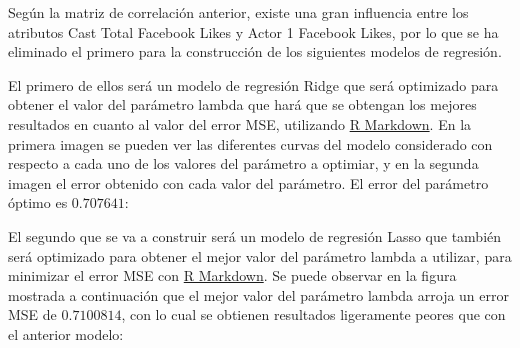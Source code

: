 \documentclass{article}
\begin{document}
Según la matriz de correlación anterior, existe una gran influencia entre los atributos Cast Total Facebook Likes y Actor 1 Facebook Likes, por lo que se ha eliminado el primero para la construcción de los siguientes modelos de regresión.

\clearpage

El primero de ellos será un modelo de regresión Ridge\cite{glmnet} que será optimizado para obtener el valor del parámetro lambda que hará que se obtengan los mejores resultados en cuanto al valor del error MSE, utilizando \href{https://github.com/pozueco/proyecto_fin_de_master/blob/master/model_supervised.md}{R Markdown}. En la primera imagen se pueden ver las diferentes curvas del modelo considerado con respecto a cada uno de los valores del parámetro a optimiar, y en la segunda imagen el error obtenido con cada valor del parámetro. El error del parámetro óptimo es $0.707641$:

\begin{figure}[h]
\centering
{}
\end{figure}

El segundo que se va a construir será un modelo de regresión Lasso\cite{glmnet} que también será optimizado para obtener el mejor valor del parámetro lambda a utilizar, para minimizar el error MSE con \href{https://github.com/pozueco/proyecto_fin_de_master/blob/master/model_supervised.md}{R Markdown}. Se puede observar en la figura mostrada a continuación que el mejor valor del parámetro lambda arroja un error MSE de $0.7100814$, con lo cual se obtienen resultados ligeramente peores que con el anterior modelo:
\end{document}
